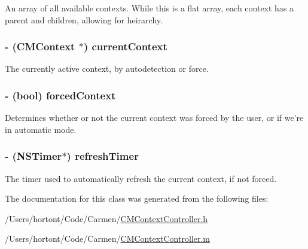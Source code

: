 An array of all available contexts. While this is a flat array, each context has a parent and children, allowing for heirarchy. 

\hypertarget{interface_c_m_context_controller_8b34e13150d8651ccab4608b479808a0}{
\subsubsection[currentContext]{\setlength{\rightskip}{0pt plus 5cm}- ({\bf CMContext} $\ast$) {\bf currentContext}}}
\label{interface_c_m_context_controller_8b34e13150d8651ccab4608b479808a0}


The currently active context, by autodetection or force. 

\hypertarget{interface_c_m_context_controller_e518de0ebea35e4508147b44593b97e0}{
\subsubsection[forcedContext]{\setlength{\rightskip}{0pt plus 5cm}- (bool) {\bf forcedContext}}}
\label{interface_c_m_context_controller_e518de0ebea35e4508147b44593b97e0}


Determines whether or not the current context was forced by the user, or if we're in automatic mode. 

\hypertarget{interface_c_m_context_controller_ae5f83ba2bf74f94700ed577b2212f8a}{
\subsubsection[refreshTimer]{\setlength{\rightskip}{0pt plus 5cm}- (NSTimer$\ast$) {\bf refreshTimer}}}
\label{interface_c_m_context_controller_ae5f83ba2bf74f94700ed577b2212f8a}


The timer used to automatically refresh the current context, if not forced. 



The documentation for this class was generated from the following files:\begin{CompactItemize}
\item 
/Users/hortont/Code/Carmen/\hyperlink{_c_m_context_controller_8h}{CMContextController.h}\item 
/Users/hortont/Code/Carmen/\hyperlink{_c_m_context_controller_8m}{CMContextController.m}\end{CompactItemize}

